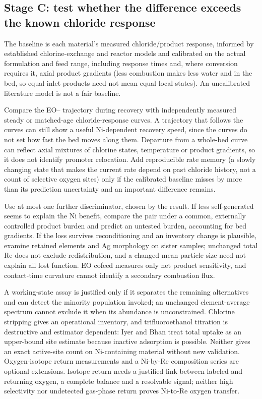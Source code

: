 \subsection{Stage C: test whether the difference exceeds the known chloride response}

The baseline is each material's measured chloride/product response, informed by established chlorine-exchange and reactor models and calibrated on the actual formulation and feed range, including response times and, where conversion requires it, axial product gradients (less combustion makes less water and \COtwo{} in the bed, so equal inlet products need not mean equal local states).\citep{iyer2021,santos2024} An uncalibrated literature model is not a fair baseline.

Compare the EO--\COtwo{} trajectory during recovery with independently measured steady or matched-age chloride-response curves. A trajectory that follows the curves can still show a useful Ni-dependent recovery speed, since the curves do not set how fast the bed moves along them. Departure from a whole-bed curve can reflect axial mixtures of chlorine states, temperature or product gradients, so it does not identify promoter relocation. Add reproducible rate memory (a slowly changing state that makes the current rate depend on past chloride history, not a count of selective oxygen sites) only if the calibrated baseline misses by more than its prediction uncertainty and an important difference remains.

Use at most one further discriminator, chosen by the result. If less self-generated \COtwo{} seems to explain the Ni benefit, compare the pair under a common, externally controlled product burden and predict an untested burden, accounting for bed gradients. If the loss survives reconditioning and an inventory change is plausible, examine retained elements and Ag morphology on sister samples; unchanged total Re does not exclude redistribution, and a changed mean particle size need not explain all lost function. EO cofeed measures only net product sensitivity, and contact-time curvature cannot identify a secondary combustion flux.

A working-state assay is justified only if it separates the remaining alternatives and can detect the minority population invoked; an unchanged element-average spectrum cannot exclude it when its abundance is unconstrained. Chlorine stripping gives an operational inventory, and trifluoroethanol titration is destructive and estimator dependent: Iyer and Bhan treat total uptake as an upper-bound site estimate because inactive adsorption is possible.\citep{iyer2023} Neither gives an exact active-site count on Ni-containing material without new validation. Oxygen-isotope return measurements and a Ni-by-Re composition series are optional extensions. Isotope return needs a justified link between labeled and returning oxygen, a complete balance and a resolvable signal; neither high selectivity nor undetected gas-phase return proves Ni-to-Re oxygen transfer.

